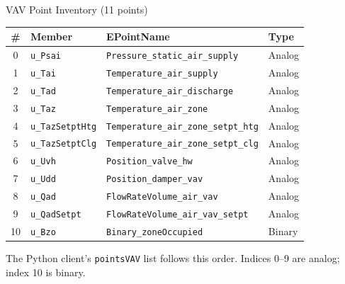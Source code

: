 \documentclass[aspectratio=169]{beamer}
\begin{document}
\begin{frame}{VAV Point Inventory (11 points)}

\begin{center}
\footnotesize
\begin{tabular}{clll}
\toprule
\textbf{\#} & \textbf{Member} & \textbf{EPointName} & \textbf{Type} \\
\midrule
0  & \texttt{u\_Psai}      & \texttt{Pressure\_static\_air\_supply}      & Analog \\
1  & \texttt{u\_Tai}       & \texttt{Temperature\_air\_supply}           & Analog \\
2  & \texttt{u\_Tad}       & \texttt{Temperature\_air\_discharge}        & Analog \\
3  & \texttt{u\_Taz}       & \texttt{Temperature\_air\_zone}             & Analog \\
4  & \texttt{u\_TazSetptHtg} & \texttt{Temperature\_air\_zone\_setpt\_htg} & Analog \\
5  & \texttt{u\_TazSetptClg} & \texttt{Temperature\_air\_zone\_setpt\_clg} & Analog \\
6  & \texttt{u\_Uvh}       & \texttt{Position\_valve\_hw}                & Analog \\
7  & \texttt{u\_Udd}       & \texttt{Position\_damper\_vav}              & Analog \\
8  & \texttt{u\_Qad}       & \texttt{FlowRateVolume\_air\_vav}           & Analog \\
9  & \texttt{u\_QadSetpt}  & \texttt{FlowRateVolume\_air\_vav\_setpt}    & Analog \\
10 & \texttt{u\_Bzo}       & \texttt{Binary\_zoneOccupied}               & Binary \\
\bottomrule
\end{tabular}
\end{center}

\vspace{0.3em}
\small The Python client's \texttt{pointsVAV} list follows this order.
Indices 0--9 are analog; index 10 is binary.
\end{frame}
\end{document}
